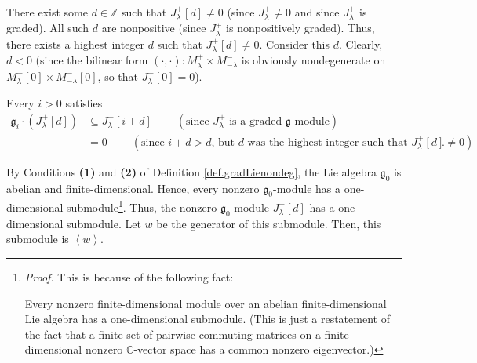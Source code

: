 \documentclass
[numbers=enddot,12pt,final,onecolumn,german,notitlepage]{scrartcl}%
\theoremstyle{definition}
\begin{document}
There exist some $d\in\mathbb{Z}$ such that $J_{\lambda}^{+}\left[  d\right]
\neq0$ (since $J_{\lambda}^{+}\neq0$ and since $J_{\lambda}^{+}$ is graded).
All such $d$ are nonpositive (since $J_{\lambda}^{+}$ is nonpositively
graded). Thus, there exists a highest integer $d$ such that $J_{\lambda}%
^{+}\left[  d\right]  \neq0$. Consider this $d$. Clearly, $d<0$ (since the
bilinear form $\left(  \cdot,\cdot\right)  :M_{\lambda}^{+}\times M_{-\lambda
}^{-}$ is obviously nondegenerate on $M_{\lambda}^{+}\left[  0\right]  \times
M_{-\lambda}^{-}\left[  0\right]  $, so that $J_{\lambda}^{+}\left[  0\right]
=0$).

Every $i>0$ satisfies
\begin{align*}
\mathfrak{g}_{i}\cdot\left(  J_{\lambda}^{+}\left[  d\right]  \right)   &
\subseteq J_{\lambda}^{+}\left[  i+d\right]  \ \ \ \ \ \ \ \ \ \ \left(
\text{since }J_{\lambda}^{+}\text{ is a graded }\mathfrak{g}\text{-module}%
\right) \\
&  =0\ \ \ \ \ \ \ \ \ \ \left(  \text{since }i+d>d\text{, but }d\text{ was
the highest integer such that }J_{\lambda}^{+}\left[  d\right]  \neq0\right)
.
\end{align*}


By Conditions \textbf{(1)} and \textbf{(2)} of Definition
\ref{def.gradLienondeg}, the Lie algebra $\mathfrak{g}_{0}$ is abelian and
finite-dimensional. Hence, every nonzero $\mathfrak{g}_{0}$-module has a
one-dimensional submodule\footnote{\textit{Proof.} This is because of the
following fact:
\par
Every nonzero finite-dimensional module over an abelian finite-dimensional Lie
algebra has a one-dimensional submodule. (This is just a restatement of the
fact that a finite set of pairwise commuting matrices on a finite-dimensional
nonzero $\mathbb{C}$-vector space has a common nonzero eigenvector.)}. Thus,
the nonzero $\mathfrak{g}_{0}$-module $J_{\lambda}^{+}\left[  d\right]  $ has
a one-dimensional submodule. Let $w$ be the generator of this submodule. Then,
this submodule is $\left\langle w\right\rangle $.
\end{document}

